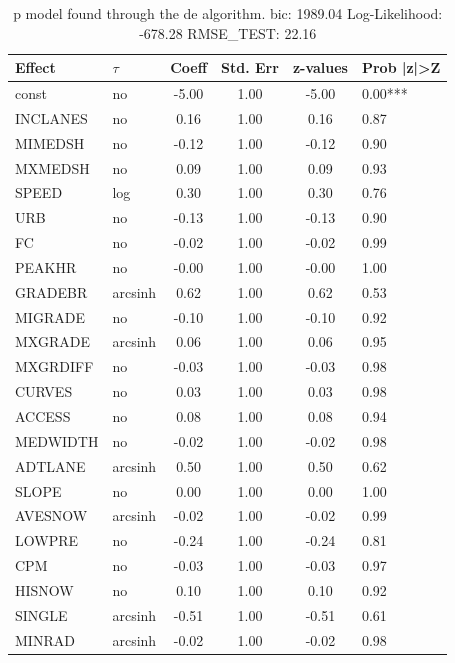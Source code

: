 \begin{table}
	\caption{p model found through the de algorithm. bic: 1989.04 Log-Likelihood: -678.28 RMSE_TEST: 22.16}
	\begin{center}
		\begin{tabular}{|l|l|c|c|c|l|}
			\hline
			Effect & $\tau$ & Coeff & Std. Err & z-values & Prob |z|>Z \\
			\hline
			const & no & -5.00 & 1.00 & -5.00 & 0.00*** \\
			\hline
			INCLANES & no & 0.16 & 1.00 & 0.16 & 0.87 \\
			\hline
			MIMEDSH & no & -0.12 & 1.00 & -0.12 & 0.90 \\
			\hline
			MXMEDSH & no & 0.09 & 1.00 & 0.09 & 0.93 \\
			\hline
			SPEED & log & 0.30 & 1.00 & 0.30 & 0.76 \\
			\hline
			URB & no & -0.13 & 1.00 & -0.13 & 0.90 \\
			\hline
			FC & no & -0.02 & 1.00 & -0.02 & 0.99 \\
			\hline
			PEAKHR & no & -0.00 & 1.00 & -0.00 & 1.00 \\
			\hline
			GRADEBR & arcsinh & 0.62 & 1.00 & 0.62 & 0.53 \\
			\hline
			MIGRADE & no & -0.10 & 1.00 & -0.10 & 0.92 \\
			\hline
			MXGRADE & arcsinh & 0.06 & 1.00 & 0.06 & 0.95 \\
			\hline
			MXGRDIFF & no & -0.03 & 1.00 & -0.03 & 0.98 \\
			\hline
			CURVES & no & 0.03 & 1.00 & 0.03 & 0.98 \\
			\hline
			ACCESS & no & 0.08 & 1.00 & 0.08 & 0.94 \\
			\hline
			MEDWIDTH & no & -0.02 & 1.00 & -0.02 & 0.98 \\
			\hline
			ADTLANE & arcsinh & 0.50 & 1.00 & 0.50 & 0.62 \\
			\hline
			SLOPE & no & 0.00 & 1.00 & 0.00 & 1.00 \\
			\hline
			AVESNOW & arcsinh & -0.02 & 1.00 & -0.02 & 0.99 \\
			\hline
			LOWPRE & no & -0.24 & 1.00 & -0.24 & 0.81 \\
			\hline
			CPM & no & -0.03 & 1.00 & -0.03 & 0.97 \\
			\hline
			HISNOW & no & 0.10 & 1.00 & 0.10 & 0.92 \\
			\hline
			SINGLE & arcsinh & -0.51 & 1.00 & -0.51 & 0.61 \\
			\hline
			MINRAD & arcsinh & -0.02 & 1.00 & -0.02 & 0.98 \\

\end{tabular}
\end{center}
\end{table}
